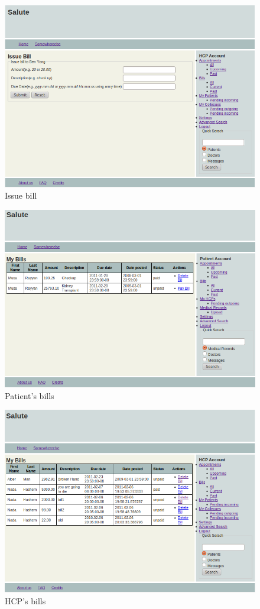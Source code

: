 \documentclass[10pt]{report}
\begin{document}
\begin{figure}
\includegraphics[scale=0.6]{screenshots/issuebill.png}
\caption{Issue bill}
\end{figure}

\begin{figure}
\includegraphics[scale=0.6]{screenshots/patient_bills.png}
\caption{Patient's bills}
\end{figure}

\begin{figure}
\includegraphics[scale=0.6]{screenshots/doc_bills.png}
\caption{HCP's bills}
\end{figure}
\end{document}
